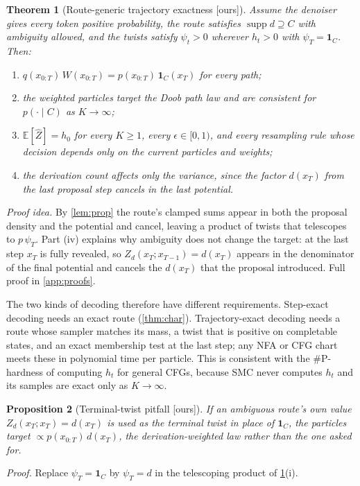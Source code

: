\documentclass[11pt]{article}
\newtheorem{theorem}{Theorem}[section]
\newtheorem{proposition}[theorem]{Proposition}
\theoremstyle{definition}
\newcommand{\one}{\mathbf{1}}
\newcommand{\E}{\mathbb{E}}
\newcommand{\Zh}{\widehat Z}
\newcommand{\status}[1]{\textsf{\small[#1]}}
\newcommand{\proofref}[1]{\par\noindent\textit{Proof.} #1\par\smallskip}
\begin{document}
\begin{theorem}[Route-generic trajectory exactness \status{ours}]\label{thm:traj}
Assume the denoiser gives every token positive probability, the route satisfies $\operatorname{supp}d\supseteq C$
with ambiguity allowed, and the twists satisfy $\psi_t>0$ wherever $h_t>0$ with $\psi_T=\one_C$. Then:
\begin{enumerate}[label=(\roman*),nosep]
  \item $q(x_{0:T})\,W(x_{0:T})=p(x_{0:T})\,\one_C(x_T)$ for every path;
  \item the weighted particles target the Doob path law and are consistent for $p(\cdot\mid C)$ as $K\to\infty$;
  \item $\E[\Zh]=h_0$ for every $K\ge1$, every $\epsilon\in[0,1)$, and every resampling rule whose decision
    depends only on the current particles and weights;
  \item the derivation count affects only the variance, since the factor $d(x_T)$ from the last proposal step
    cancels in the last potential.
\end{enumerate}
\end{theorem}
\noindent\textit{Proof idea.} By \cref{lem:prop} the route's clamped sums appear in both the proposal density and
the potential and cancel, leaving a product of twists that telescopes to $p\,\psi_T$. Part (iv) explains why
ambiguity does not change the target: at the last step $x_T$ is fully revealed, so $Z_d(x_T;x_{T-1})=d(x_T)$ appears in the
denominator of the final potential and cancels the $d(x_T)$ that the proposal introduced. Full proof in
\cref{app:proofs}. \smallskip

The two kinds of decoding therefore have different requirements. Step-exact decoding needs an exact route
(\cref{thm:char}). Trajectory-exact decoding needs a route whose sampler matches its mass, a twist that is
positive on completable states, and an exact membership test at the last step; any NFA or CFG chart meets these
in polynomial time per particle. This is consistent with the \#P-hardness of computing $h_t$ for general CFGs,
because SMC never computes $h_t$ and its samples are exact only as $K\to\infty$.

\begin{proposition}[Terminal-twist pitfall \status{ours}]\label{prop:terminal}
If an ambiguous route's own value $Z_d(x_T;x_T)=d(x_T)$ is used as the terminal twist in place of $\one_C$, the
particles target $\propto p(x_{0:T})\,d(x_T)$, the derivation-weighted law rather than the one asked for.
\end{proposition}
\proofref{Replace $\psi_T=\one_C$ by $\psi_T=d$ in the telescoping product of \cref{thm:traj}(i).}
\end{document}
